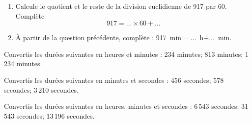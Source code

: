 \begin{myenumerate}
  \item
    \begin{enumerate}
    \item Calcule le quotient et le reste de la division euclidienne de 917 par 60. Complète
\[917=\ldots\times60+\ldots\]
\item \`A partir de la question précédente, complète : 917~min$=\ldots$~h$+\ldots$~min.
    \end{enumerate}
  \item Convertis les durées suivantes en heures et minutes : 234 minutes; 813 minutes; 1\,234 minutes.
  \item Convertis les durées suivantes en minutes et secondes : 456 secondes; 578 secondes; 3\,210 secondes.
  \item Convertis les durées suivantes en heures, minutes et secondes
    : 6\,543 secondes; 31\,543 secondes; 13\,196 secondes.
\end{myenumerate}